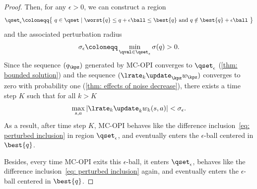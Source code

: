 \begin{proof}
    Then, for any $\epsilon > 0$, we can construct a region
    \begin{align}
        \qset_\epsilon
        \coloneqq
        \big\{ \ q \in \qset \mid \worst{q} \leq q + \epsilon \ball \leq \best{q} \text{~and~} q \notin \best{q} + \epsilon \ball \ \big\}
    \end{align}
    and the associated perturbation radius
    \begin{align}
        \sigma_\epsilon \coloneqq
        \min_{\qval \in \qset_\epsilon} \sigma(q) > 0 .
    \end{align}
    Since the sequence $(q_\kpz)$ generated by MC-OPI converges to $\qset_\epsilon$ (\autoref{thm: bounded solution}) 
    and the sequence $(\lrate_k \update_\kpz w_\kpz)$ converges to zero with probability one (\autoref{thm: effects of noise decrease}),
    there exists a time step $K$ such that for all $k>K$
    \begin{align}
        \max_{s,a} | \lrate_k \update_k w_k(s,a) | < \sigma_\epsilon .
    \end{align}
    As a result, after time step $K$, MC-OPI behaves like the difference inclusion~\eqref{eq: perturbed inclusion} in region $\qset_\epsilon$, and eventually enters the $\epsilon$-ball centered in $\best{q}$.

    Besides, every time MC-OPI exits this $\epsilon$-ball, it enters $\qset_\epsilon$, behaves like the difference inclusion~\eqref{eq: perturbed inclusion} again, and eventually enters the $\epsilon$-ball centered in $\best{q}$.
\end{proof}